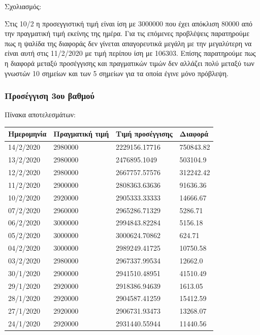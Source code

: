 \documentclass[a4paper,11pt]{article}
\begin{document}
	Σχολιασμός:
	\hfill \break
	
	Στις 10/2 η προσεγγιστική τιμή είναι ίση με 3000000 που έχει απόκλιση 80000 από την πραγματική τιμή εκείνης της ημέρα. Για τις επόμενες προβλέψεις παρατηρούμε πως η ψαλίδα της διαφοράς δεν γίνεται απαγορευτικά μεγάλη με την μεγαλύτερη να είναι αυτή στις 11/2/2020 με τιμή περίπου ίση με 106303. Επίσης παρατηρούμε πως η διαφορά μεταξύ προσέγγισης και πραγματικών τιμών δεν αλλάζει πολύ μεταξύ των γνωστών 10 σημείων και των 5 σημείων για τα οποία έγινε μόνο πρόβλεψη.
	
	


	\subsubsection{Προσέγγιση 3ου βαθμού}
	
	Πίνακα αποτελεσμάτων:

	\begin{tabular}{| l | l | l | l |}
	\hline
	Ημερομηνία & Πραγματική τιμή & Τιμή προσέγγισης & Διαφορά
	\\ \hline
	14/2/2020 & 2980000 & 2229156.17716 & 750843.82
	\\ \hline
	13/2/2020 & 2980000 & 2476895.1049 & 503104.9
	\\ \hline
	12/2/2020 & 2980000 & 2667757.57576 & 312242.42
	\\ \hline
	11/2/2020 & 2900000 & 2808363.63636 & 91636.36
	\\ \hline
	10/2/2020 & 2920000 & 2905333.33333 & 14666.67
	\\ \hline
	07/2/2020 & 2960000 & 2965286.71329 & 5286.71
	\\ \hline
	06/2/2020 & 3000000 & 2994843.82284 & 5156.18
	\\ \hline
	05/2/2020 & 3000000 & 3000624.70862 & 624.71
	\\ \hline
	04/2/2020 & 3000000 & 2989249.41725 & 10750.58
	\\ \hline
	03/2/2020 & 2980000 & 2967337.99534 & 12662.0
	\\ \hline
	30/1/2020 & 2900000 & 2941510.48951 & 41510.49
	\\ \hline
	29/1/2020 & 2920000 & 2918386.94639 & 1613.05
	\\ \hline
	28/1/2020 & 2920000 & 2904587.41259 & 15412.59
	\\ \hline
	27/1/2020 & 2920000 & 2906731.93473 & 13268.07
	\\ \hline
	24/1/2020 & 2920000 & 2931440.55944 & 11440.56
	\\ \hline
	\end{tabular}
\end{document}
